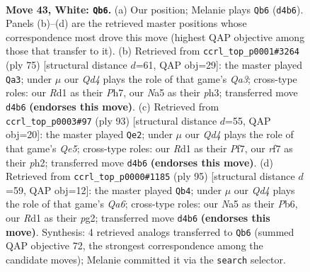 \documentclass[11pt]{article}
\begin{document}
\clearpage

\begin{figure}[p]\centering
\begin{subfigure}{0.46\textwidth}\centering
\resizebox{\linewidth}{!}{%
\newchessgame
\chessboard[
  setfen={6k1/5rrp/8/Np5P/3Q2P1/8/PP3P1K/3R4 w - - 3 43},
  showmover=false,
  pgfstyle=straightmove, color=movearrow, markmove={d4-b6}
]}
\caption{}
\end{subfigure}\hfill
\begin{subfigure}{0.46\textwidth}\centering
\resizebox{\linewidth}{!}{%
\newchessgame
\chessboard[
  setfen={8/5pkp/q3p3/5p2/8/4P2P/6P1/2R2RK1 b - - 2 38},
  showmover=false,
  pgfstyle=straightmove, color=movearrow, markmove={a6-a3}
]}
\caption{}
\end{subfigure}
\\[4pt]
\begin{subfigure}{0.46\textwidth}\centering
\resizebox{\linewidth}{!}{%
\newchessgame
\chessboard[
  setfen={8/1p3pk1/8/8/1R2q1pP/8/5P1P/1R4K1 b - - 4 47},
  showmover=false,
  pgfstyle=straightmove, color=movearrow, markmove={e4-e2}
]}
\caption{}
\end{subfigure}\hfill
\begin{subfigure}{0.46\textwidth}\centering
\resizebox{\linewidth}{!}{%
\newchessgame
\chessboard[
  setfen={8/p5k1/1p5p/1P4p1/8/q2R4/6PP/3R3K b - - 9 48},
  showmover=false,
  pgfstyle=straightmove, color=movearrow, markmove={a3-b4}
]}
\caption{}
\end{subfigure}
\caption{\textbf{Move 43, White: \texttt{Qb6}.} (a) Our position; Melanie plays \texttt{Qb6} (\texttt{d4b6}). Panels (b)--(d) are the retrieved master positions whose correspondence most drove this move (highest QAP objective among those that transfer to it). (b) Retrieved from \texttt{ccrl\_top\_p0001\#3264} (ply 75) [structural distance $d$=61, QAP obj=29]: the master played \texttt{Qa3}; under $\mu$ our \emph{Qd4} plays the role of that game's \emph{Qa3}; cross-type roles: our \emph{R}d1 as their \emph{P}h7, our \emph{N}a5 as their \emph{p}h3; transferred move \texttt{d4b6} \textbf{(endorses this move)}. (c) Retrieved from \texttt{ccrl\_top\_p0003\#97} (ply 93) [structural distance $d$=55, QAP obj=20]: the master played \texttt{Qe2}; under $\mu$ our \emph{Qd4} plays the role of that game's \emph{Qe5}; cross-type roles: our \emph{R}d1 as their \emph{P}f7, our \emph{r}f7 as their \emph{p}h2; transferred move \texttt{d4b6} \textbf{(endorses this move)}. (d) Retrieved from \texttt{ccrl\_top\_p0000\#1185} (ply 95) [structural distance $d$=59, QAP obj=12]: the master played \texttt{Qb4}; under $\mu$ our \emph{Qd4} plays the role of that game's \emph{Qa6}; cross-type roles: our \emph{N}a5 as their \emph{P}b6, our \emph{R}d1 as their \emph{p}g2; transferred move \texttt{d4b6} \textbf{(endorses this move)}. Synthesis: 4 retrieved analogs transferred to \texttt{Qb6} (summed QAP objective 72, the strongest correspondence among the candidate moves); Melanie committed it via the \texttt{search} selector.}
\label{fig:thought-m84}
\end{figure}
\end{document}
